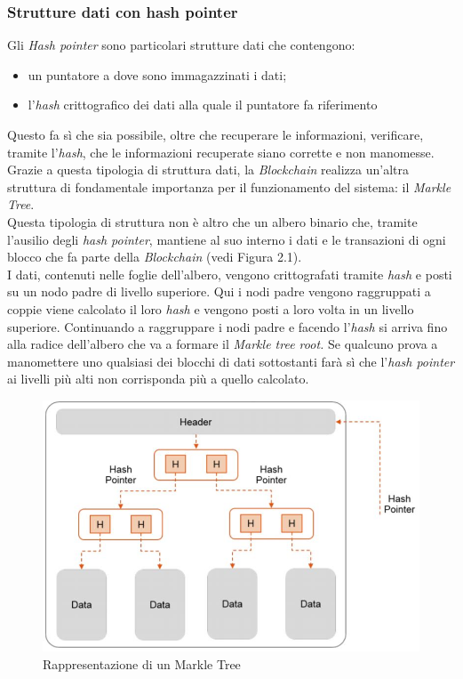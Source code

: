 \subsubsection{Strutture dati con hash pointer}
Gli \textit{Hash pointer} sono particolari strutture dati che contengono:
\begin{itemize}
	\item un puntatore a dove sono immagazzinati i dati;
	\item l'\textit{hash} crittografico dei dati alla quale il puntatore fa riferimento
\end{itemize}
Questo fa sì che sia possibile, oltre che recuperare le informazioni, verificare, tramite l'\textit{hash}, che le informazioni recuperate siano corrette e non manomesse.\\
Grazie a questa tipologia di struttura dati, la \textit{Blockchain} realizza un'altra struttura di fondamentale importanza per il funzionamento del sistema: il \textit{Markle Tree}.\\
Questa tipologia di struttura non è altro che un albero binario che, tramite l'ausilio degli \textit{hash pointer}, mantiene al suo interno i dati e le transazioni di ogni blocco che fa parte della \textit{Blockchain} (vedi Figura 2.1).\\
I dati, contenuti nelle foglie dell'albero, vengono crittografati tramite \textit{hash} e posti su un nodo padre di livello superiore. Qui i nodi padre vengono raggruppati a coppie viene calcolato il loro \textit{hash} e vengono posti a loro volta in un livello superiore. 
Continuando a raggruppare i nodi padre e facendo l'\textit{hash} si arriva fino alla radice dell'albero che va a formare il \textit{Markle tree root.}
Se qualcuno prova a manomettere uno qualsiasi dei blocchi di dati sottostanti farà sì che l'\textit{hash pointer} ai livelli più alti non corrisponda più a quello calcolato.
\begin{figure}[!h]
	\centering
	\includegraphics[scale=0.50]{immagini/markle_tree}
	\caption{Rappresentazione di un Markle Tree}
\end{figure} 

